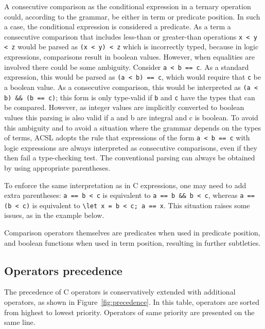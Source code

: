   A consecutive comparison as the conditional expression in a ternary operation could, according to the grammar, be either in term or
  predicate position. In such a case, the conditional expression is
  considered a predicate. As a term a consecutive comparison that includes less-than or greater-than operations
  \lstinline|x < y < z| would
  be parsed as \lstinline|(x < y) < z| which is incorrectly typed,
  because in logic expressions, comparisons result in boolean values.
  However, when equalities are involved there could be some ambiguity.
  Consider \lstinline|a < b == c|. As a standard expression, this would be parsed as
  \lstinline|(a < b) == c|, which would require that \lstinline|c| be a boolean value.
  As a consecutive comparison, this would be interpreted as
  \lstinline|(a < b) && (b == c)|; this form is only type-valid if \lstinline|b| and
  \lstinline|c| have the types that can be compared. However, as integer values are
  implicitly converted to boolean values this parsing is also valid if a and b are integral and c is boolean.
  To avoid this ambiguity and to avoid a situation where the grammar depends on the types of terms,
  ACSL adopts the rule that expressions of the form \lstinline|a < b == c| with logic expressions
  are always interpreted as consecutive comparisons, even if they then fail a type-checking test.
  The conventional parsing can always be obtained by using appropriate parentheses.

  To enforce the same interpretation as in C expressions, one may need
  to add extra parentheses: \lstinline|a == b < c| is equivalent
  to \lstinline|a == b && b < c|, whereas
  \lstinline |a == (b < c)| is
  equivalent to \lstinline|\let x = b < c; a == x|.
  This situation raises some issues, as in the example below.


Comparison operators themselves are
predicates when used in predicate position, and boolean functions when
used in term position, resulting in further subtleties.
\begin{example}

\end{example}

\subsection{Operators precedence}

The precedence of C operators is conservatively extended with
additional operators, as shown in Figure~\ref{fig:precedence}. In this
table, operators are sorted from highest to lowest priority. Operators
of same priority are presented on the same line.


